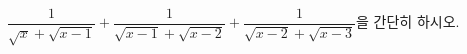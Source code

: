 \hspace*{2mm}\begin{minipage}[t]{\dimexpr\linewidth-2mm\relax}\vspace{0pt}
$\dfrac{1}{\sqrt{x}+\sqrt{x-1}}+\dfrac{1}{\sqrt{x-1}+\sqrt{x-2}}+\dfrac{1}{\sqrt{x-2}+\sqrt{x-3}}$을 간단히 하시오.\end{minipage}
